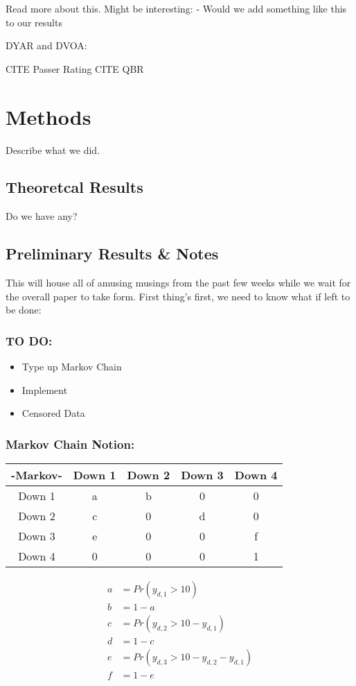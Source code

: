\documentclass[aoas]{imsart}\usepackage[]{graphicx}\usepackage[]{color}
\begin{document}
Read more about this.  Might be interesting:  
- Would we add something like this to our results

DYAR and DVOA: %

CITE Passer Rating
CITE QBR

\section{Methods}
Describe what we did.  

\subsection{Theoretcal Results}
Do we have any? 

\subsection{Preliminary Results \& Notes}

This will house all of amusing musings from the past few weeks while we wait for the overall paper to take form. First thing's first, we need to know what if left to be done:

\subsubsection{TO DO:}
\begin{itemize}
	\item Type up Markov Chain
	\item Implement %
	\item Censored Data
\end{itemize}

\subsubsection{Markov Chain Notion: }
\begin{center}
	\begin{tabular}{|c |c c c c|} 
		\hline
		-Markov- & Down 1 & Down 2 & Down 3 & Down 4 \\ \hline
		Down 1 & a & b & 0 & 0 \\ 
		\hline
		Down 2 & c & 0 & d & 0 \\
		\hline
		Down 3 & e & 0 & 0 & f\\
		\hline
		Down 4 & 0 & 0 & 0 & 1 \\
		\hline
	\end{tabular}
	\begin{align*}
	a &= Pr(y_{d,1} > 10)\\
	b &= 1-a\\
	c &= Pr(y_{d,2} > 10 - y_{d,1})\\
	d &= 1 - c\\
	e &= Pr(y_{d,3} > 10 - y_{d,2} - y_{d,1})\\
	f &= 1 - e
	\end{align*}
\end{center}
\end{document}
